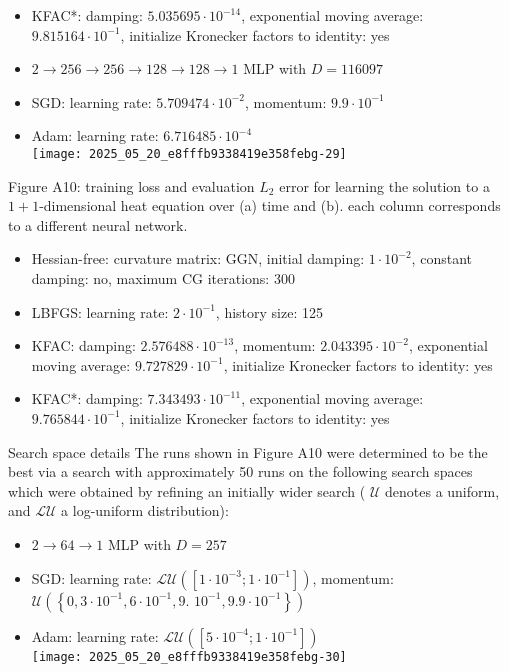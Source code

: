 \documentclass[10pt]{article}
\begin{document}
\begin{itemize}
  \item KFAC*: damping: $5.035695 \cdot 10^{-14}$, exponential moving average: $9.815164 \cdot 10^{-1}$, initialize Kronecker factors to identity: yes
  \item $2 \rightarrow 256 \rightarrow 256 \rightarrow 128 \rightarrow 128 \rightarrow 1$ MLP with $D=116097$
  \item SGD: learning rate: $5.709474 \cdot 10^{-2}$, momentum: $9.9 \cdot 10^{-1}$
  \item Adam: learning rate: $6.716485 \cdot 10^{-4}$\\
\texttt{[image: 2025\_05\_20\_e8fffb9338419e358febg-29]}
\end{itemize}

Figure A10: training loss and evaluation $L_{2}$ error for learning the solution to a $1+1$-dimensional heat equation over (a) time and (b). each column corresponds to a different neural network.

\begin{itemize}
  \item Hessian-free: curvature matrix: GGN, initial damping: $1 \cdot 10^{-2}$, constant damping: no, maximum CG iterations: 300
  \item LBFGS: learning rate: $2 \cdot 10^{-1}$, history size: 125
  \item KFAC: damping: $2.576488 \cdot 10^{-13}$, momentum: $2.043395 \cdot 10^{-2}$, exponential moving average: $9.727829 \cdot 10^{-1}$, initialize Kronecker factors to identity: yes
  \item KFAC*: damping: $7.343493 \cdot 10^{-11}$, exponential moving average: $9.765844 \cdot 10^{-1}$, initialize Kronecker factors to identity: yes
\end{itemize}

Search space details The runs shown in Figure A10 were determined to be the best via a search with approximately 50 runs on the following search spaces which were obtained by refining an initially wider search ( $\mathcal{U}$ denotes a uniform, and $\mathcal{L U}$ a log-uniform distribution):

\begin{itemize}
  \item $2 \rightarrow 64 \rightarrow 1$ MLP with $D=257$
  \item SGD: learning rate: $\mathcal{L U}\left(\left[1 \cdot 10^{-3} ; 1 \cdot 10^{-1}\right]\right)$, momentum: $\mathcal{U}\left(\left\{0,3 \cdot 10^{-1}, 6 \cdot 10^{-1}, 9\right.\right.$. $\left.\left.10^{-1}, 9.9 \cdot 10^{-1}\right\}\right)$
  \item Adam: learning rate: $\mathcal{L U}\left(\left[5 \cdot 10^{-4} ; 1 \cdot 10^{-1}\right]\right)$\\
\texttt{[image: 2025\_05\_20\_e8fffb9338419e358febg-30]}
\end{itemize}
\end{document}
